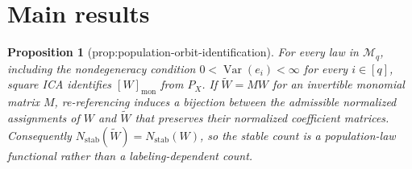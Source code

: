 \documentclass{article}
\newtheorem{proposition}{Proposition}
\begin{document}
\section{Main results}

\begin{proposition}[prop:population-orbit-identification]\label{prop:population-orbit-identification}
For every law in \(\mathcal M_q\), including the nondegeneracy condition \(0<\operatorname{Var}(e_i)<\infty\) for every \(i\in[q]\), square ICA identifies \([W]_{\mathrm{mon}}\) from \(P_X\). If \(\widetilde W=MW\) for an invertible monomial matrix \(M\), re-referencing induces a bijection between the admissible normalized assignments of \(W\) and \(\widetilde W\) that preserves their normalized coefficient matrices. Consequently \(N_{\mathrm{stab}}(\widetilde W)=N_{\mathrm{stab}}(W)\), so the stable count is a population-law functional rather than a labeling-dependent count.
\end{proposition}
\end{document}
